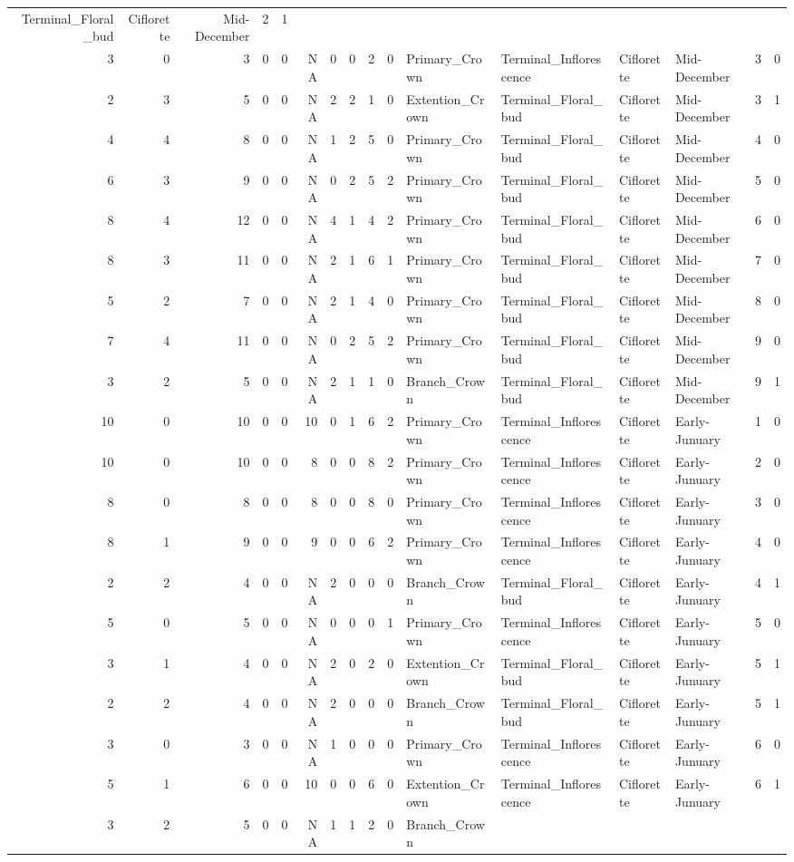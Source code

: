 \documentclass[]{article}
\begin{document}
\begin{longtable}[]{@{}rrrrrrrrrrllllrl@{}}
Terminal\_Floral\_bud & Ciflorette & Mid-December & 2 & 1\tabularnewline
3 & 0 & 3 & 0 & 0 & NA & 0 & 0 & 2 & 0 & Primary\_Crown &
Terminal\_Inflorescence & Ciflorette & Mid-December & 3 &
0\tabularnewline
2 & 3 & 5 & 0 & 0 & NA & 2 & 2 & 1 & 0 & Extention\_Crown &
Terminal\_Floral\_bud & Ciflorette & Mid-December & 3 & 1\tabularnewline
4 & 4 & 8 & 0 & 0 & NA & 1 & 2 & 5 & 0 & Primary\_Crown &
Terminal\_Floral\_bud & Ciflorette & Mid-December & 4 & 0\tabularnewline
6 & 3 & 9 & 0 & 0 & NA & 0 & 2 & 5 & 2 & Primary\_Crown &
Terminal\_Floral\_bud & Ciflorette & Mid-December & 5 & 0\tabularnewline
8 & 4 & 12 & 0 & 0 & NA & 4 & 1 & 4 & 2 & Primary\_Crown &
Terminal\_Floral\_bud & Ciflorette & Mid-December & 6 & 0\tabularnewline
8 & 3 & 11 & 0 & 0 & NA & 2 & 1 & 6 & 1 & Primary\_Crown &
Terminal\_Floral\_bud & Ciflorette & Mid-December & 7 & 0\tabularnewline
5 & 2 & 7 & 0 & 0 & NA & 2 & 1 & 4 & 0 & Primary\_Crown &
Terminal\_Floral\_bud & Ciflorette & Mid-December & 8 & 0\tabularnewline
7 & 4 & 11 & 0 & 0 & NA & 0 & 2 & 5 & 2 & Primary\_Crown &
Terminal\_Floral\_bud & Ciflorette & Mid-December & 9 & 0\tabularnewline
3 & 2 & 5 & 0 & 0 & NA & 2 & 1 & 1 & 0 & Branch\_Crown &
Terminal\_Floral\_bud & Ciflorette & Mid-December & 9 & 1\tabularnewline
10 & 0 & 10 & 0 & 0 & 10 & 0 & 1 & 6 & 2 & Primary\_Crown &
Terminal\_Inflorescence & Ciflorette & Early-Junuary & 1 &
0\tabularnewline
10 & 0 & 10 & 0 & 0 & 8 & 0 & 0 & 8 & 2 & Primary\_Crown &
Terminal\_Inflorescence & Ciflorette & Early-Junuary & 2 &
0\tabularnewline
8 & 0 & 8 & 0 & 0 & 8 & 0 & 0 & 8 & 0 & Primary\_Crown &
Terminal\_Inflorescence & Ciflorette & Early-Junuary & 3 &
0\tabularnewline
8 & 1 & 9 & 0 & 0 & 9 & 0 & 0 & 6 & 2 & Primary\_Crown &
Terminal\_Inflorescence & Ciflorette & Early-Junuary & 4 &
0\tabularnewline
2 & 2 & 4 & 0 & 0 & NA & 2 & 0 & 0 & 0 & Branch\_Crown &
Terminal\_Floral\_bud & Ciflorette & Early-Junuary & 4 &
1\tabularnewline
5 & 0 & 5 & 0 & 0 & NA & 0 & 0 & 0 & 1 & Primary\_Crown &
Terminal\_Inflorescence & Ciflorette & Early-Junuary & 5 &
0\tabularnewline
3 & 1 & 4 & 0 & 0 & NA & 2 & 0 & 2 & 0 & Extention\_Crown &
Terminal\_Floral\_bud & Ciflorette & Early-Junuary & 5 &
1\tabularnewline
2 & 2 & 4 & 0 & 0 & NA & 2 & 0 & 0 & 0 & Branch\_Crown &
Terminal\_Floral\_bud & Ciflorette & Early-Junuary & 5 &
1\tabularnewline
3 & 0 & 3 & 0 & 0 & NA & 1 & 0 & 0 & 0 & Primary\_Crown &
Terminal\_Inflorescence & Ciflorette & Early-Junuary & 6 &
0\tabularnewline
5 & 1 & 6 & 0 & 0 & 10 & 0 & 0 & 6 & 0 & Extention\_Crown &
Terminal\_Inflorescence & Ciflorette & Early-Junuary & 6 &
1\tabularnewline
3 & 2 & 5 & 0 & 0 & NA & 1 & 1 & 2 & 0 & Branch\_Crown &

\end{longtable}
\end{document}
